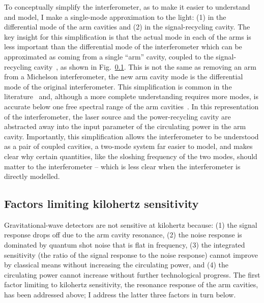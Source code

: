 To conceptually simplify the interferometer, as to make it easier to understand and model, I make a single-mode approximation to the light: (1) in the differential mode of the arm cavities and (2) in the signal-recycling cavity. %
The key insight for this simplification is that the actual mode in each of the arms is less important than the differential mode of the interferometer which can be approximated as coming from a single ``arm'' cavity, coupled to the signal-recycling cavity~\cite{}, as shown in Fig.~\ref{}. This is not the same as removing an arm from a Michelson interferometer, the new arm cavity mode is the differential mode of the original interferometer.
This simplification is common in the literature~\cite{Korobko2019,Adya2020} and, although a more complete understanding requires more modes, is accurate below one free spectral range of the arm cavities~\cite{Miaoetal2015,}. In this representation of the interferometer, the laser source and the power-recycling cavity are abstracted away into the input parameter of the circulating power in the arm cavity.
Importantly, this simplification allows the interferometer to be understood as a pair of coupled cavities, a two-mode system far easier to model, and makes clear why certain quantities, like the sloshing frequency of the two modes, should matter to the interferometer -- which is less clear when the interferometer is directly modelled.


\subsection{Factors limiting kilohertz sensitivity}

Gravitational-wave detectors are not sensitive at kilohertz because: (1) the signal response drops off due to the arm cavity resonance, (2) the noise response is dominated by quantum shot noise that is flat in frequency, (3) the integrated sensitivity (the ratio of the signal response to the noise response) cannot improve by classical means without increasing the circulating power, and (4) the circulating power cannot increase without further technological progress.
The first factor limiting to kilohertz sensitivity, the resonance response of the arm cavities, has been addressed above; I address the latter three factors in turn below.

